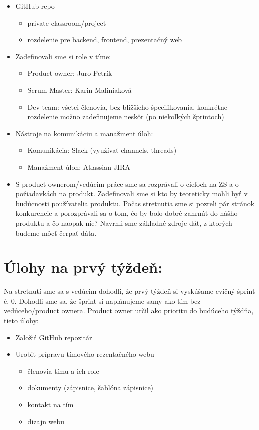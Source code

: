 \documentclass{article}
\begin{document}
    \begin{itemize}
        \item GitHub repo
        \begin{itemize}
            \item private classroom/project
            \item rozdelenie pre backend, frontend, prezentačný web
        \end{itemize}
        \item Zadefinovali sme si role v tíme:
        \begin{itemize}
            \item Product owner: Juro Petrík
            \item Scrum Master: Karin Maliniaková
            \item Dev team: všetci členovia, bez bližšieho špecifikovania, konkrétne rozdelenie možno zadefinujeme neskôr (po niekoľkých šprintoch)
        \end{itemize}
        \item Nástroje na komunikáciu a manažment úloh:
        \begin{itemize}
            \item Komunikácia: Slack (využívať channels, threads)
            \item Manažment úloh: Atlassian JIRA
        \end{itemize}
        \item S product ownerom/vedúcim práce sme sa rozprávali o cieľoch na ZS a o požiadavkách na produkt. Zadefinovali sme si kto by teoreticky mohli byť v budúcnosti 
        používatelia produktu. Počas stretnutia sme si pozreli pár stránok konkurencie a porozprávali sa o tom, čo by bolo dobré zahrnúť do nášho produktu a čo naopak nie? 
        Navrhli sme základné zdroje dát, z ktorých budeme môcť čerpať dáta. 
    \end{itemize}


    \section*{Úlohy na prvý týždeň:}

    \textnormal{Na stretnutí sme sa s vedúcim dohodli, že prvý týždeň si vyskúšame cvičný šprint č. 0. 
    Dohodli sme sa, že šprint si naplánujeme samy ako tím bez vedúceho/product ownera. Product owner určil ako prioritu do budúceho týždňa, tieto úlohy:}

    \begin{itemize}
        \item Založiť GitHub repozitár
        \item Urobiť prípravu tímového rezentačného webu
        \begin{itemize}
            \item členovia tímu a ich role
            \item dokumenty (zápisnice, šablóna zápisnice)
            \item kontakt na tím
            \item dizajn webu
        \end{itemize}
    \end{itemize}
\end{document}
